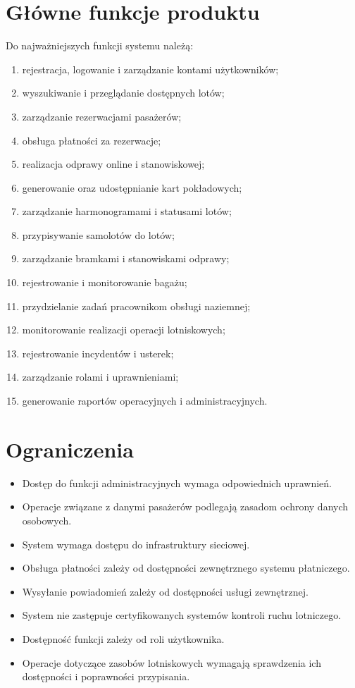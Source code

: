\documentclass[12pt,a4paper,oneside]{report}
\begin{document}
\section{Główne funkcje produktu}
Do najważniejszych funkcji systemu należą:
\begin{enumerate}
    \item rejestracja, logowanie i zarządzanie kontami użytkowników;
    \item wyszukiwanie i przeglądanie dostępnych lotów;
    \item zarządzanie rezerwacjami pasażerów;
    \item obsługa płatności za rezerwacje;
    \item realizacja odprawy online i stanowiskowej;
    \item generowanie oraz udostępnianie kart pokładowych;
    \item zarządzanie harmonogramami i statusami lotów;
    \item przypisywanie samolotów do lotów;
    \item zarządzanie bramkami i stanowiskami odprawy;
    \item rejestrowanie i monitorowanie bagażu;
    \item przydzielanie zadań pracownikom obsługi naziemnej;
    \item monitorowanie realizacji operacji lotniskowych;
    \item rejestrowanie incydentów i usterek;
    \item zarządzanie rolami i uprawnieniami;
    \item generowanie raportów operacyjnych i administracyjnych.
\end{enumerate}

\section{Ograniczenia}
\begin{itemize}
    \item Dostęp do funkcji administracyjnych wymaga odpowiednich uprawnień.
    \item Operacje związane z danymi pasażerów podlegają zasadom ochrony danych osobowych.
    \item System wymaga dostępu do infrastruktury sieciowej.
    \item Obsługa płatności zależy od dostępności zewnętrznego systemu płatniczego.
    \item Wysyłanie powiadomień zależy od dostępności usługi zewnętrznej.
    \item System nie zastępuje certyfikowanych systemów kontroli ruchu lotniczego.
    \item Dostępność funkcji zależy od roli użytkownika.
    \item Operacje dotyczące zasobów lotniskowych wymagają sprawdzenia ich dostępności i poprawności przypisania.
\end{itemize}
\end{document}
